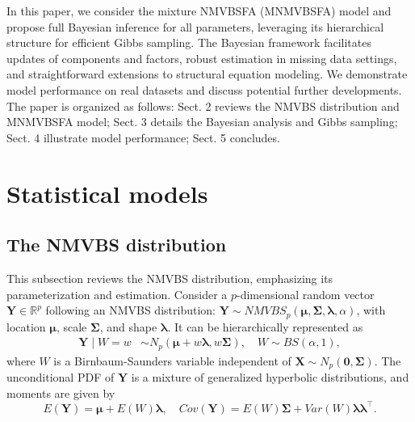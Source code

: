 \documentclass[twoside]{article}
\theoremstyle{definition}
\begin{document}
In this paper, we consider the mixture NMVBSFA (MNMVBSFA) model \citep{Hashemi:2024} and propose full Bayesian inference for all parameters, leveraging its hierarchical structure for efficient Gibbs sampling. The Bayesian framework facilitates updates of components and factors, robust estimation in missing data settings, and straightforward extensions to structural equation modeling. We demonstrate model performance on real datasets and discuss potential further developments. The paper is organized as follows: Sect. 2 reviews the NMVBS distribution and MNMVBSFA model; Sect. 3 details the Bayesian analysis and Gibbs sampling; Sect. 4 illustrate model performance; Sect. 5 concludes.
\vspace{-0.7cm}
\section{Statistical models}\label{sec1}
\vspace{-0.7cm}
\subsection{The NMVBS distribution}
This subsection reviews the NMVBS distribution, emphasizing its parameterization and estimation. Consider a $p$-dimensional random vector $\bm Y \in \mathbb{R}^p$ following an NMVBS distribution: $\bm Y \sim NMVBS_p(\bm\mu, \bm\Sigma, \bm\lambda, \alpha)$, with location $\bm\mu$, scale $\bm\Sigma$, and shape $\bm\lambda$. It can be hierarchically represented as
\begin{align}
	\bm Y \mid W=w &\sim {N}_p(\bm\mu + w\bm\lambda, w\bm\Sigma), \quad W \sim BS(\alpha,1),
\end{align}
where $W$ is a Birnbaum-Saunders variable independent of $\bm X \sim {N}_p(\bm 0, \bm\Sigma)$. The unconditional PDF of $\bm Y$ is a mixture of generalized hyperbolic distributions, and moments are given by
\[
E(\bm Y) = \bm\mu + E(W)\bm\lambda, \quad Cov(\bm Y) = E(W)\bm\Sigma + Var(W)\bm\lambda \bm\lambda^\top.
\]
\end{document}
